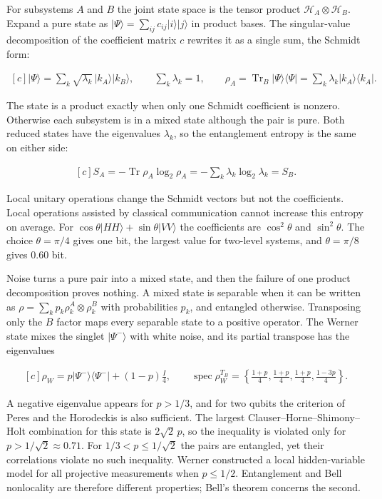 \documentclass[11pt,oneside]{book}
\newenvironment{centeredalign}{\[\begin{gathered}[c]}{\end{gathered}\]}
\newcommand{\ket}[1]{\lvert #1\rangle}
\newcommand{\bra}[1]{\langle #1\rvert}
\begin{document}
For subsystems \(A\) and \(B\) the joint state space is the tensor product \(\mathcal H_A\otimes\mathcal H_B\). Expand a pure state as \(\ket\Psi=\sum_{ij}c_{ij}\ket{i}\ket{j}\) in product bases. The singular-value decomposition of the coefficient matrix \(c\) rewrites it as a single sum, the Schmidt form:

\begin{centeredalign}
\ket\Psi=\sum_k\sqrt{\lambda_k}\,\ket{k_A}\ket{k_B},\qquad \sum_k\lambda_k=1,\qquad
\rho_A=\operatorname{Tr}_B\ket\Psi\bra\Psi=\sum_k\lambda_k\ket{k_A}\bra{k_A}.
\end{centeredalign}

The state is a product exactly when only one Schmidt coefficient is nonzero. Otherwise each subsystem is in a mixed state although the pair is pure. Both reduced states have the eigenvalues \(\lambda_k\), so the entanglement entropy is the same on either side:

\begin{centeredalign}
S_A=-\operatorname{Tr}\rho_A\log_2\rho_A=-\sum_k\lambda_k\log_2\lambda_k=S_B.
\end{centeredalign}

Local unitary operations change the Schmidt vectors but not the coefficients. Local operations assisted by classical communication cannot increase this entropy on average. For \(\cos\theta\ket{HH}+\sin\theta\ket{VV}\) the coefficients are \(\cos^2\theta\) and \(\sin^2\theta\). The choice \(\theta=\pi/4\) gives one bit, the largest value for two-level systems, and \(\theta=\pi/8\) gives 0.60 bit.

Noise turns a pure pair into a mixed state, and then the failure of one product decomposition proves nothing. A mixed state is separable when it can be written as \(\rho=\sum_kp_k\rho_k^A\otimes\rho_k^B\) with probabilities \(p_k\), and entangled otherwise. Transposing only the \(B\) factor maps every separable state to a positive operator. The Werner state mixes the singlet \(\ket{\Psi^-}\) with white noise, and its partial transpose has the eigenvalues

\begin{centeredalign}
\rho_W=p\ket{\Psi^-}\bra{\Psi^-}+(1-p)\frac{I}{4},\qquad
\operatorname{spec}\rho_W^{T_B}=\left\{\tfrac{1+p}{4},\tfrac{1+p}{4},\tfrac{1+p}{4},\tfrac{1-3p}{4}\right\}.
\end{centeredalign}

A negative eigenvalue appears for \(p>1/3\), and for two qubits the criterion of Peres and the Horodeckis is also sufficient. The largest Clauser--Horne--Shimony--Holt combination for this state is \(2\sqrt2\,p\), so the inequality is violated only for \(p>1/\sqrt2\approx0.71\). For \(1/3<p\leq1/\sqrt2\) the pairs are entangled, yet their correlations violate no such inequality. Werner constructed a local hidden-variable model for all projective measurements when \(p\leq1/2\). Entanglement and Bell nonlocality are therefore different properties; Bell's theorem concerns the second.
\end{document}

